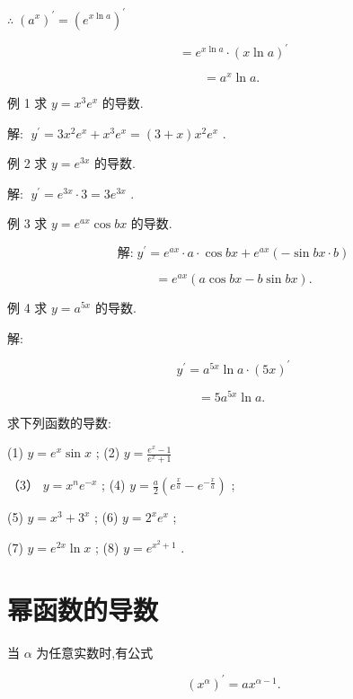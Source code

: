 \documentclass[lang=cn,newtx,10pt,scheme=chinese]{elegantbook}
\begin{document}
\(\therefore \;{\left( {a}^{x}\right) }^{\prime } = {\left( {e}^{x\ln a}\right) }^{\prime }\)

\[
= {e}^{x\ln a} \cdot {\left( x\ln a\right) }^{\prime }
\]

\[
= {a}^{x}\ln a\text{. }
\]

例 1 求 \(y = {x}^{3}{e}^{x}\) 的导数.

解: \(\;{y}^{\prime } = 3{x}^{2}{e}^{x} + {x}^{3}{e}^{x} = \left( {3 + x}\right) {x}^{2}{e}^{x}\) .

例 2 求 \(y = {e}^{3x}\) 的导数.

解: \(\;{y}^{\prime } = {e}^{3x} \cdot 3 = 3{e}^{3x}\) .

例 3 求 \(y = {e}^{ax}\cos {bx}\) 的导数.

\[
\text{解:}\;{y}^{\prime } = {e}^{ax} \cdot a \cdot \cos {bx} + {e}^{ax}\left( {-\sin {bx} \cdot b}\right)
\]

\[
= {e}^{ax}\left( {a\cos {bx} - b\sin {bx}}\right) \text{.}
\]

例 4 求 \(y = {a}^{5x}\) 的导数.

解:

\[
{y}^{\prime } = {a}^{5x}\ln a \cdot {\left( 5x\right) }^{\prime }
\]

\[
= 5{a}^{5x}\ln a\text{. }
\]

\begin{problemset}[练习]

\item 求下列函数的导数:

(1) \(y = {e}^{x}\sin x\) ; (2) \(y = \frac{{e}^{x} - 1}{{e}^{x} + 1}\)

（3） \(y = {x}^{n}{e}^{-x}\) ; (4) \(y = \frac{a}{2}\left( {{e}^{\frac{x}{a}} - {e}^{-\frac{x}{a}}}\right)\) ;

(5) \(y = {x}^{3} + {3}^{x}\) ; (6) \(y = {2}^{x}{e}^{x}\) ;

(7) \(y = {e}^{2x}\ln x\) ; (8) \(y = {e}^{{x}^{2} + 1}\) .

\end{problemset}

\section{幂函数的导数}

\begin{proposition}[幂函数的导数]

当 \(\alpha\) 为任意实数时,有公式

\[
{\left( {x}^{\alpha }\right) }^{\prime } = a{x}^{\alpha - 1}.
\]

\end{proposition}
\end{document}
